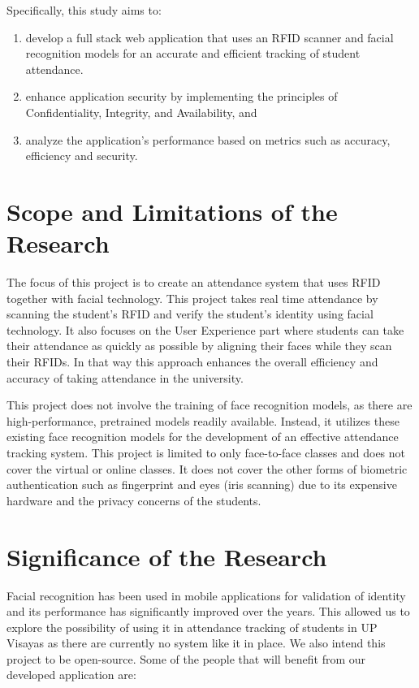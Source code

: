 Specifically, this study aims to:

\begin{enumerate}

   \item develop a full stack web application that uses an RFID scanner and facial recognition models for an accurate and efficient tracking of student attendance.
   \item enhance application security by implementing the principles of Confidentiality, Integrity, and Availability, and
   \item analyze the application's performance based on metrics such as accuracy, efficiency and security.
\end{enumerate}

\section{Scope and Limitations of the Research}
\label{sec:scopelimitations}

The focus of this project is to create an attendance system that uses RFID together with facial technology. This project takes real time attendance by scanning the student's RFID and verify the student's identity using facial technology. It also focuses on the User Experience part where students can take their attendance as quickly as possible by aligning their faces while they scan their RFIDs. In that way this approach enhances the overall efficiency and accuracy of taking attendance in the university.

This project does not involve the training of face recognition models, as there are high-performance, pretrained models readily available. Instead, it utilizes these existing face recognition models for the development of an effective attendance tracking system. This project is limited to only face-to-face classes and does not cover the virtual or online classes. It does not cover the other forms of biometric authentication such as fingerprint and eyes (iris scanning) due to its expensive hardware and the privacy concerns of the students.

\newpage
\section{Significance of the Research}
\label{sec:significance}

	Facial recognition has been used in mobile applications for validation of identity and its performance has significantly improved over the years. This allowed us to explore the possibility of using it in attendance tracking of students in UP Visayas as there are currently no system like it in place. We also intend this project to be open-source. Some of the people that will benefit from our developed application are:
	
